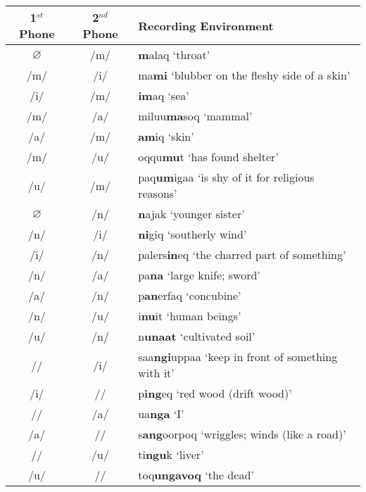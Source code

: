 \documentclass[12pt]{article}
\begin{document}
	\begin{tabular}{|c|c|l|}
	\hline
	1$^{st}$ Phone & 2$^{nd}$ Phone & Recording Environment \\
	\hline
	$\varnothing$ & /m/ & \textbf{m}alaq `throat'\\
	/m/ & /i/ & ma\textbf{mi} `blubber on the fleshy side of a skin'\\
	/i/ & /m/ & \textbf{im}aq `sea' \\
	/m/ & /a/ & miluu\textbf{ma}soq `mammal'\\
	/a/ & /m/ & \textbf{am}iq `skin' \\
	/m/ & /u/ & oqqu\textbf{mu}t `has found shelter'\\
	/u/ & /m/ & paq\textbf{um}igaa `is shy of it for religious reasons'\\
	$\varnothing$ & /n/ & \textbf{n}ajak `younger sister'\\
	/n/ & /i/ & \textbf{ni}giq `southerly wind' \\
	/i/ & /n/ & palers\textbf{in}eq `the charred part of something'\\
	/n/ & /a/ & pa\textbf{na} `large knife; sword'\\
	/a/ & /n/ & p\textbf{an}erfaq `concubine'\\
	/n/ & /u/ & i\textbf{nu}it `human beings'\\
	/u/ & /n/ & n\textbf{unaat} `cultivated soil'\\
	/\textipa{N}/ & /i/ & saa\textbf{ngi}uppaa `keep in front of something with it'\\
	/i/ & /\textipa{N}/ & p\textbf{ing}eq `red wood (drift wood)'\\
	/\textipa{N}/ & /a/ & ua\textbf{nga} `I' \\
	/a/ & /\textipa{N}/ & s\textbf{ang}oorpoq `wriggles; winds (like a road)'\\
	/\textipa{N}/ & /u/ & ti\textbf{ngu}k `liver'\\
	/u/ & /\textipa{N}/ & toq\textbf{ungavoq} `the dead'\\
	\hline
	\end{tabular}
	\newpage
\end{document}
